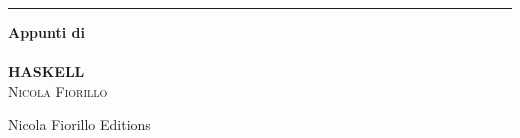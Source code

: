 \begin{titlepage}
	
	\raggedleft
	\rule{1pt}{\textheight}
	\hspace{0.05\textwidth}
	\parbox[b]{0.85\textwidth}{
		
		{\Huge\bfseries Appunti di\\\\HASKELL}\\[2\baselineskip]
		{\Large\textsc{Nicola Fiorillo}}
        {\date{\today}}
		
		\vspace{0.5\textheight}
		
		{\noindent Nicola Fiorillo Editions}\\[\baselineskip]
	}

\end{titlepage}
